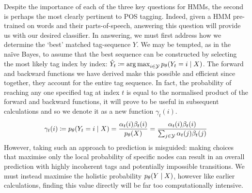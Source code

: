 \documentclass[../main.tex]{subfiles}
\begin{document}
Despite the importance of each of the three key questions for HMMs, the second is perhaps the most clearly pertinent to POS tagging. Indeed, given a HMM pre-trained on words and their parts-of-speech, answering this question will provide us with our desired classifier.
In answering, we must first address how we determine the `best' matched tag-sequence $Y$.
We may be tempted, as in the na{\"i}ve Bayes, to assume that the best sequence can be constructed by selecting the most likely tag index by index: $\hat{Y}_t \coloneqq \operatorname*{arg\,max}_{i \in \mathcal{Y}} p_\theta(Y_t = i \mid X)$.
The forward and backward functions we have derived make this possible and efficient since together, they account for the entire tag sequence.
In fact, the probability of reaching any one specified tag at index $t$ is equal to the normalised product of the forward and backward functions, it will prove to be useful in subsequent calculations and so we denote it as a new function $\gamma_t(i)$.
\begin{equation*}
\gamma_t(i) \coloneqq p_\theta(Y_t = i \mid X) = \frac{\alpha_t(i)\beta_t(i)}{p_\theta(X)} = \frac{\alpha_t(i)\beta_t(i)}{\sum_{j \in \mathcal{Y}}\alpha_t(j) \beta_t(j)}
\end{equation*}
However, taking such an approach to prediction is misguided: making choices that maximise only the local probability of specific nodes can result in an overall prediction with highly incoherent tags and potentially impossible transitions.
We must instead maximise the holistic probability $p_\theta(Y \mid X)$, however like earlier calculations, finding this value directly will be far too computationally intensive.
\end{document}
